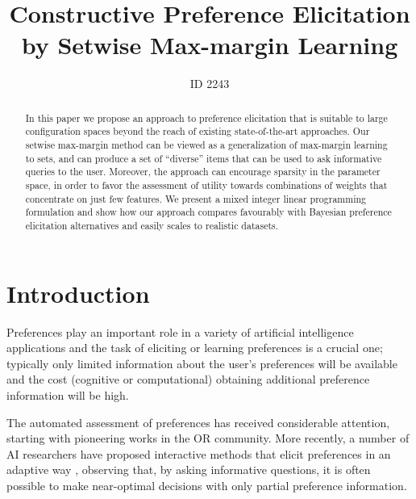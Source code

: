\documentclass{article}
\title{Constructive Preference Elicitation by Setwise Max-margin Learning} %
\author{ID 2243}
\renewcommand\[{\begin{equation}}
\renewcommand\]{\end{equation}}
\begin{document}
\maketitle

\begin{abstract}
  In this paper we propose an approach to preference elicitation that
  is suitable to large configuration spaces beyond the reach of
  existing state-of-the-art approaches. Our setwise max-margin method
  can be viewed as a generalization of max-margin learning to sets,
  and can produce a set of ``diverse'' items that can be used to ask
  informative queries to the user.  Moreover, the approach can
  encourage sparsity in the parameter space, in order to favor the
  assessment of utility towards combinations of weights that
  concentrate on just few features.  We present a mixed integer linear
  programming formulation and show how our approach compares
  favourably with Bayesian preference elicitation alternatives and
  easily scales to realistic datasets.
\end{abstract}

\section{Introduction}

Preferences \cite{Peintner2008} play an important role in a variety of artificial
intelligence applications and the task of eliciting or learning preferences is a crucial one; 
typically only limited
information about the user's preferences will be available and the
cost (cognitive or computational) obtaining additional preference information will be high.  

The automated assessment of preferences has received considerable attention,
starting with pioneering works \cite{White1984,JacquetLagreze95} in the OR community.
More recently, a number of AI researchers have proposed interactive methods that elicit
preferences in an adaptive way
\cite{chajewska2000,boutilier2002,Wang2003,boutilier2006,guo2010real,viappiani2010optimal},
observing that, by asking informative questions, it is often possible to make near-optimal decisions with only partial preference information.
\end{document}
